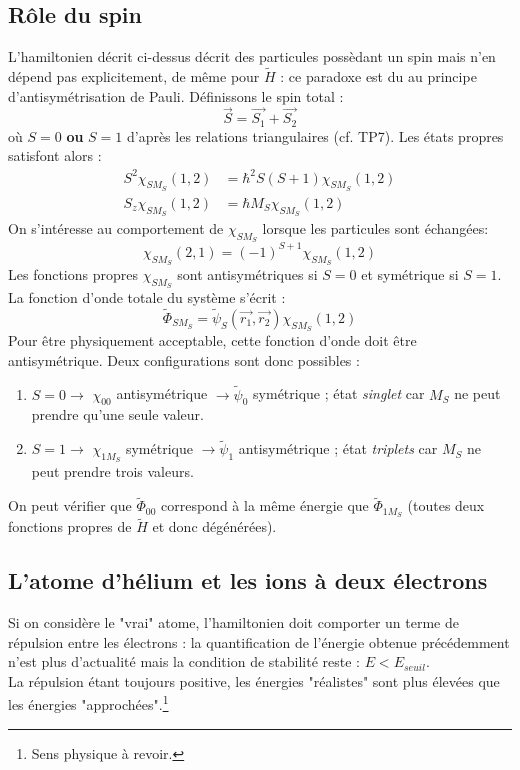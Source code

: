 \documentclass	[11pt, a4paper, openany]{book}
\begin{document}
    \subsection{Rôle du spin}
    L'hamiltonien décrit ci-dessus décrit des particules possèdant un spin mais n'en 
    dépend pas explicitement, de même pour $\tilde{H}$ : ce paradoxe est du au principe
    d'antisymétrisation de Pauli. Définissons le spin total :
    \begin{equation}
    \vec{S}=\vec{S_1}+\vec{S_2}
    \end{equation}
    où $S=0$ \textbf{ou} $S=1$ d'après les relations triangulaires (cf. TP7). Les états 
    propres satisfont alors :
    \begin{equation}
    \begin{array}{ll}
    S^2\chi_{SM_S}(1,2) &= \hbar^2S(S+1)\chi_{SM_S}(1,2)\\
    S_z\chi_{SM_S}(1,2) &= \hbar M_S\chi_{SM_S}(1,2)    
    \end{array}
    \end{equation}
    On s'intéresse au comportement de $\chi_{SM_S}$ lorsque les particules sont échangées:
    \begin{equation}
    \chi_{SM_S}(2,1) = (-1)^{S+1}\chi_{SM_S}(1,2)
    \end{equation}
    Les fonctions propres $\chi_{SM_S}$ sont antisymétriques si $S=0$ et symétrique si 
    $S=1$. La fonction d'onde totale du système s'écrit :
    \begin{equation}
    \tilde{\Phi}_{SM_S} = \tilde{\psi}_S(\vec{r_1},\vec{r_2})\chi_{SM_S}(1,2)
    \end{equation}
    Pour \^etre physiquement acceptable, cette fonction d'onde doit \^etre antisymétrique.
    Deux configurations sont donc possibles :
    \begin{enumerate}
    \item $S=0 \rightarrow$ $\chi_{00}$ antisymétrique $\rightarrow \tilde{\psi}_0$ 
    symétrique ; état \textit{singlet} car $M_S$ ne peut prendre qu'une seule valeur.
    \item $S=1 \rightarrow$ $\chi_{1M_S}$ symétrique $\rightarrow \tilde{\psi}_1$ 
    antisymétrique ; état \textit{triplets} car $M_S$ ne peut prendre trois valeurs.
    \end{enumerate}
	On peut vérifier que $\tilde{\Phi}_{00}$ correspond à la même énergie que $\tilde{
	\Phi}_{1M_S}$ (toutes deux fonctions propres de $\tilde{H}$ et donc dégénérées).
	
	
	\subsection{L'atome d'hélium et les ions à deux électrons}
	Si on considère le "vrai" atome, l'hamiltonien doit comporter un terme de répulsion 
	entre les électrons : la quantification de l'énergie obtenue précédemment n'est plus
	d'actualité mais la condition de stabilité reste : $E<E_{seuil}$.\\
	La répulsion étant toujours positive, les énergies "réalistes" sont plus élevées que 
	les énergies "approchées".\footnote{Sens physique à revoir.}
	
\end{document}
